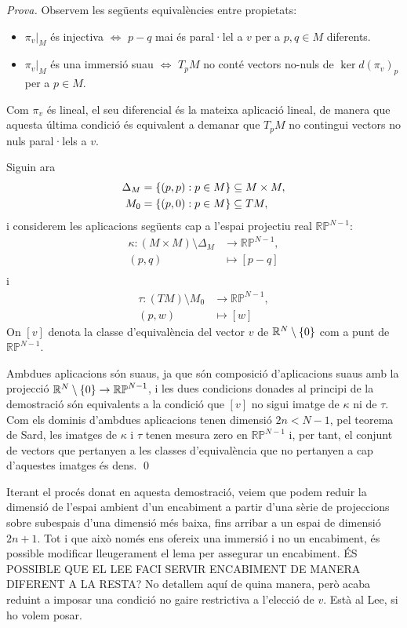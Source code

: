 {
    \color{green!50!black} 
    \textit{Prova.}
    Observem les següents equivalències entre propietats:
    \begin{itemize}
        \item $\pi_v|_M$ és injectiva $\iff$ $p-q$ mai és paral·lel a $v$ per a $p,q\in M$ diferents.
        \item $\pi_v|_M$ és una immersió suau $\iff$ $T_pM$ no conté vectors no-nuls de $\ker d(\pi_v)_p$ per a $p\in M$.
    \end{itemize}
    Com $\pi_v$ és lineal, el seu diferencial és la mateixa aplicació lineal, de manera que aquesta última condició és equivalent a demanar que $T_pM$ no contingui vectors no nuls paral·lels a $v$.

    Siguin ara
    \begin{align*}
        \Delta_M &= \{(p,p):p\in M\}\subseteq M\times M,\\
        M_0 &= \{(p,0):p\in M\}\subseteq TM,\\
    \end{align*}
    i considerem les aplicacions següents cap a l'espai projectiu real $\mathbb {RP}^{N-1}$:
    \begin{align*}
        \kappa:(M\times M)\setminus\Delta_M&\to\mathbb {RP}^{N-1},\\
        (p,q) &\mapsto [p-q]\\
    \end{align*}
    i
    \begin{align*}
        \tau:(TM)\setminus M_0&\to\mathbb {RP}^{N-1},\\
        (p,w) &\mapsto [w]
    \end{align*}
    On $[v]$ denota la classe d'equivalència del vector $v$ de $\mathbb R^N\setminus\{0\}$ com a punt de $\mathbb {RP}^{N-1}$.

    Ambdues aplicacions són suaus, ja que són composició d'aplicacions suaus amb la projecció $\mathbb R^N\setminus\{0\}\to\mathbb {RP}^{N-1}$, i les dues condicions donades al principi de la demostració són equivalents a la condició que $[v]$ no sigui imatge de $\kappa$ ni de $\tau$. Com els dominis d'ambdues aplicacions tenen dimensió $2n<N-1$, pel teorema de Sard, les imatges de $\kappa$ i $\tau$ tenen mesura zero en $\mathbb {RP}^{N-1}$ i, per tant, el conjunt de vectors que pertanyen a les classes d'equivalència que no pertanyen a cap d'aquestes imatges és dens.
    \qed
}

Iterant el procés donat en aquesta demostració, veiem que podem reduir la dimensió de l'espai ambient d'un encabiment a partir d'una sèrie de projeccions sobre subespais d'una dimensió més baixa, fins arribar a un espai de dimensió $2n+1$. Tot i que això només ens ofereix una immersió i no un encabiment, és possible modificar lleugerament el lema per assegurar un encabiment. {\color{red} ÉS POSSIBLE QUE EL LEE FACI SERVIR ENCABIMENT DE MANERA DIFERENT A LA RESTA?} No detallem aquí de quina manera, però acaba reduint a imposar una condició no gaire restrictiva a l'elecció de $v$. {\color{blue} Està al Lee, si ho volem posar.}

